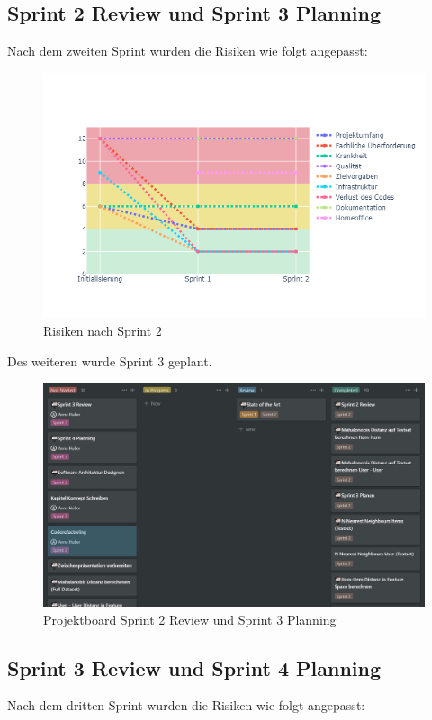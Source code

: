 \subsection*{Sprint 2 Review und Sprint 3 Planning}
Nach dem zweiten Sprint wurden die Risiken wie folgt angepasst:
\begin{figure}[htb]
	\centering
	\includegraphics[keepaspectratio,width=\linewidth]{img/Risiken per Sprint Sprint2.png}
	\caption{Risiken nach Sprint 2}
	\label{fig:Sprint 2 Risiken}
\end{figure}
Des weiteren wurde Sprint 3 geplant. 
\begin{figure}[htb]
	\centering
	\includegraphics[keepaspectratio,width=\linewidth]{img/Projektboard Sprint Review 2.png}
	\caption{Projektboard Sprint 2 Review und Sprint 3 Planning}
	\label{fig:Sprint 2 Review}
\end{figure}

\subsection*{Sprint 3 Review und Sprint 4 Planning}
Nach dem dritten Sprint wurden die Risiken wie folgt angepasst:

